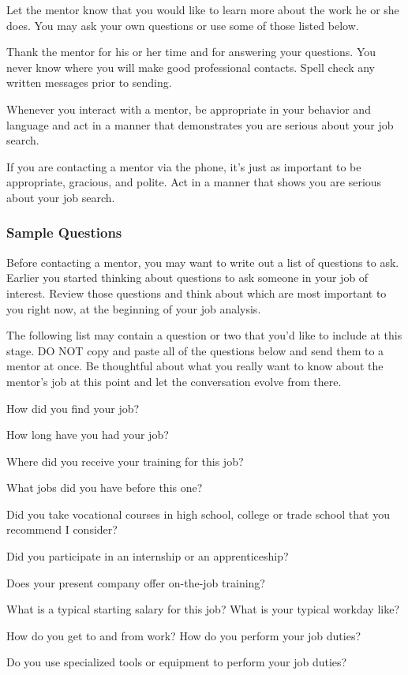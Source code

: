 Let the mentor know that you would like to learn more about the work he or she does. You may ask your own questions or use some of those listed below.

Thank the mentor for his or her time and for answering your questions.
You never know where you will make good professional contacts. Spell check any written messages prior to sending.

Whenever you interact with a mentor, be appropriate in your behavior and language and act in a manner that demonstrates you are serious about your job search.

If you are contacting a mentor via the phone, it's just as important to be appropriate, gracious, and polite. Act in a manner that shows you are serious about your job search.

\subsubsection*{Sample Questions}
Before contacting a mentor, you may want to write out a list of questions to ask. Earlier you started thinking about questions to ask someone in your job of interest. Review those questions and think about which are most important to you right now, at the beginning of your job analysis.

The following list may contain a question or two that you'd like to include at this stage. DO NOT copy and paste all of the questions below and send them to a mentor at once. Be thoughtful about what you really want to know about the mentor's job at this point and let the conversation evolve from there.

How did you find your job?

How long have you had your job?

Where did you receive your training for this job? 

What jobs did you have before this one?

Did you take vocational courses in high school, college or trade school that you recommend I consider? 

Did you participate in an internship or an apprenticeship?

Does your present company offer on-the-job training?

What is a typical starting salary for this job? What is your typical workday like?

How do you get to and from work? How do you perform your job duties?

Do you use specialized tools or equipment to perform your job duties?

